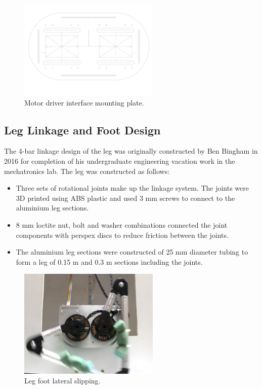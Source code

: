 \begin{figure}
\centering
\includegraphics[width=0.6\textwidth]{images/mechanical/driver-mount-plate.pdf} 
\caption{Motor driver interface mounting plate.}
\label{fig:Motor driver interface mounting plate}
\end{figure}

\subsection{Leg Linkage and Foot Design}

The 4-bar linkage design of the leg was originally constructed by Ben Bingham in 2016 for completion of his undergraduate engineering vacation work in the mechatronics lab. The leg was constructed as follows:

\begin{itemize}
\item Three sets of rotational joints make up the linkage system. The joints were 3D printed using ABS plastic and used 3 mm screws to connect to the aluminium leg sections.
\item 8 mm loctite nut, bolt and washer combinations connected the joint components with perspex discs to reduce friction between the joints.
\item The aluminium leg sections were constructed of 25 mm diameter tubing to form a leg of 0.15 m and 0.3 m sections including the joints. 
\end{itemize}

\begin{figure}
\centering
\includegraphics[width=0.6\textwidth]{images/experiments/lateral-slipping} 
\caption{Leg foot lateral slipping.}
\label{fig:foot-slipping}
\end{figure}








